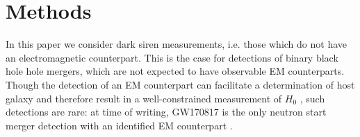 



\section{\label{sec:intro} Methods}

In this paper we consider dark siren measurements, i.e. those which do not have an electromagnetic counterpart.
This is the case for detections of binary black hole hole mergers, which are not expected to have observable EM counterparts.
Though the detection of an EM counterpart can facilitate a determination of host galaxy and therefore result in a well-constrained measurement of $H_0$ \cite{GW170817_H0}, such detections are rare: at time of writing, GW170817 is the only neutron start merger detection with an identified EM counterpart \cite{GW170817_announce}.

